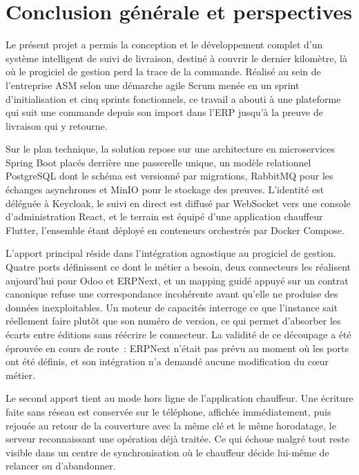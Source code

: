 \chapter*{Conclusion générale et perspectives}


Le présent projet a permis la conception et le développement complet d'un système intelligent de
suivi de livraison, destiné à couvrir le dernier kilomètre, là où le progiciel de gestion perd la
trace de la commande. Réalisé au sein de l'entreprise ASM selon une démarche agile Scrum menée en un
sprint d'initialisation et cinq sprints fonctionnels, ce travail a abouti à une plateforme qui suit
une commande depuis son import dans l'ERP jusqu'à la preuve de livraison qui y retourne.

Sur le plan technique, la solution repose sur une architecture en microservices Spring Boot placés
derrière une passerelle unique, un modèle relationnel PostgreSQL dont le schéma est versionné par
migrations, RabbitMQ pour les échanges asynchrones et MinIO pour le stockage des preuves.
L'identité est déléguée à Keycloak, le suivi en direct est diffusé par WebSocket vers une console
d'administration React, et le terrain est équipé d'une application chauffeur Flutter, l'ensemble
étant déployé en conteneurs orchestrés par Docker Compose.

L'apport principal réside dans l'intégration agnostique au progiciel de gestion. Quatre ports
définissent ce dont le métier a besoin, deux connecteurs les réalisent aujourd'hui pour Odoo et
ERPNext, et un mapping guidé appuyé sur un contrat canonique refuse une correspondance incohérente
avant qu'elle ne produise des données inexploitables. Un moteur de capacités interroge ce que
l'instance sait réellement faire plutôt que son numéro de version, ce qui permet d'absorber les
écarts entre éditions sans réécrire le connecteur. La validité de ce découpage a été éprouvée en
cours de route~: ERPNext n'était pas prévu au moment où les ports ont été définis, et son
intégration n'a demandé aucune modification du cœur métier.

Le second apport tient au mode hors ligne de l'application chauffeur. Une écriture faite sans réseau
est conservée sur le téléphone, affichée immédiatement, puis rejouée au retour de la couverture avec
la même clé et le même horodatage, le serveur reconnaissant une opération déjà traitée. Ce qui
échoue malgré tout reste visible dans un centre de synchronisation où le chauffeur décide lui-même
de relancer ou d'abandonner.

